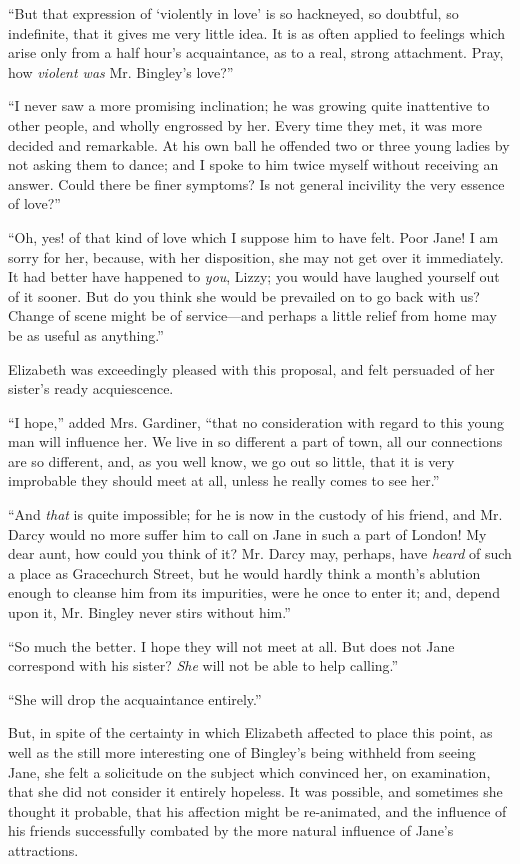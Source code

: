 \documentclass[12pt]{book}
\begin{document}
``But that expression of `violently in love' is so hackneyed, so doubtful, so indefinite, that it gives me very little idea. It is as often applied to feelings which arise only from a half hour's acquaintance, as to a real, strong attachment. Pray, how \textit{violent was} Mr. Bingley's love?''

``I never saw a more promising inclination; he was growing quite inattentive to other people, and wholly engrossed by her. Every time they met, it was more decided and remarkable. At his own ball he offended two or three young ladies by not asking them to dance; and I spoke to him twice myself without receiving an answer. Could there be finer symptoms? Is not general incivility the very essence of love?''

``Oh, yes! of that kind of love which I suppose him to have felt. Poor Jane! I am sorry for her, because, with her disposition, she may not get over it immediately. It had better have happened to \textit{you}, Lizzy; you would have laughed yourself out of it sooner. But do you think she would be prevailed on to go back with us? Change of scene might be of service---and perhaps a little relief from home may be as useful as anything.''

Elizabeth was exceedingly pleased with this proposal, and felt persuaded of her sister's ready acquiescence.

``I hope,'' added Mrs. Gardiner, ``that no consideration with regard to this young man will influence her. We live in so different a part of town, all our connections are so different, and, as you well know, we go out so little, that it is very improbable they should meet at all, unless he really comes to see her.''

``And \textit{that} is quite impossible; for he is now in the custody of his friend, and Mr. Darcy would no more suffer him to call on Jane in such a part of London! My dear aunt, how could you think of it? Mr. Darcy may, perhaps, have \textit{heard} of such a place as Gracechurch Street, but he would hardly think a month's ablution enough to cleanse him from its impurities, were he once to enter it; and, depend upon it, Mr. Bingley never stirs without him.''

``So much the better. I hope they will not meet at all. But does not Jane correspond with his sister? \textit{She} will not be able to help calling.''

``She will drop the acquaintance entirely.''

But, in spite of the certainty in which Elizabeth affected to place this point, as well as the still more interesting one of Bingley's being withheld from seeing Jane, she felt a solicitude on the subject which convinced her, on examination, that she did not consider it entirely hopeless. It was possible, and sometimes she thought it probable, that his affection might be re-animated, and the influence of his friends successfully combated by the more natural influence of Jane's attractions.
\end{document}
